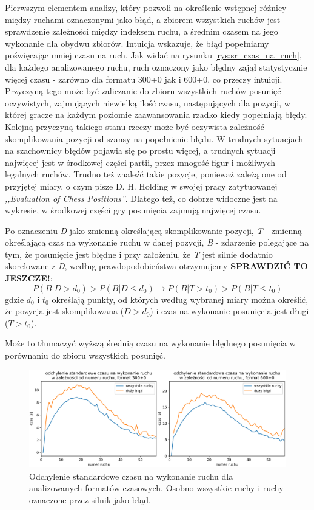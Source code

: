 \documentclass[inzynierska]{pwr_wmat_praca_dyplomowa}
\theoremstyle{plain}
\numberwithin{theorem}{chapter}
\theoremstyle{definition}
\numberwithin{theorem}{chapter}
\begin{document}
Pierwszym elementem analizy, który pozwoli na określenie wstępnej różnicy między ruchami oznaczonymi jako błąd, a zbiorem wszystkich ruchów jest sprawdzenie zależności między indeksem ruchu, a średnim czasem na jego wykonanie dla obydwu zbiorów. Intuicja wskazuje, że błąd popełniamy poświęcając mniej czasu na ruch. Jak widać na rysunku \ref{rys:sr_czas_na_ruch}, dla każdego analizowanego ruchu, ruch oznaczony jako błędny zajął statystycznie więcej czasu - zarówno dla formatu 300+0 jak i 600+0, co przeczy intuicji. 
Przyczyną tego może być zaliczanie do zbioru wszystkich ruchów posunięć oczywistych, zajmujących niewielką ilość czasu, następujących dla pozycji, w której gracze na każdym poziomie zaawansowania rzadko kiedy popełniają błędy.
Kolejną przyczyną takiego stanu rzeczy może być oczywista zależność skomplikowania pozycji od szansy na popełnienie błędu. W trudnych sytuacjach na szachownicy błędów pojawia się po prostu więcej, a trudnych sytuacji najwięcej jest w środkowej części partii, przez mnogość figur i możliwych legalnych ruchów. Trudno też znaleźć takie pozycje, ponieważ zależą one od przyjętej miary, o czym pisze D. H. Holding w swojej pracy zatytuowanej \textit{,,Evaluation of Chess Positions''}\textbf{\cite{Holding1979TheEO}}.  Dlatego też, co dobrze widoczne jest na wykresie, w środkowej części gry posunięcia zajmują najwięcej czasu.

Po oznaczeniu \textit{D} jako zmienną określającą skomplikowanie pozycji, \textit{T} - zmienną określającą czas na wykonanie ruchu w danej pozycji, \textit{B} - zdarzenie polegające na tym, że posunięcie jest błędne i przy założeniu, że \textit{T} jest silnie dodatnio skorelowane z \textit{D}, według prawdopodobieństwa otrzymujemy \textbf{SPRAWDZIĆ TO JESZCZE!}:
\begin{equation}
	P(B|D>d_0) > P(B|D\leq d_0) \rightarrow P(B|T>t_0) > P(B|T\leq t_0)
\end{equation}
gdzie $d_0$ i $t_0$ określają punkty, od których według wybranej miary można określić, że pozycja jest skomplikowana ($D>d_0$) i czas na wykonanie posunięcia jest długi ($T>t_0$).


Może to tłumaczyć wyższą średnią czasu na wykonanie błędnego posunięcia w porównaniu do zbioru wszystkich posunięć.
\begin{figure}[H]
	\centering
	\includegraphics[width=\textwidth]{std_czas_na_ruch.png}
	\caption{Odchylenie standardowe czasu na wykonanie ruchu dla analizowanych formatów czasowych. Osobno wszystkie ruchy i ruchy oznaczone przez silnik jako błąd.}
	\label{rys:std_czas_na_ruch}
\end{figure}
\end{document}
